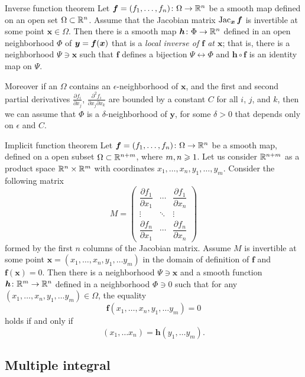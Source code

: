 \begin{thm}{Inverse function theorem}\label{thm:inverse}
Let $\bm{f}=(f_1,\dots,f_n)\colon\Omega\to\mathbb{R}^n$ be a smooth map
defined on an open set $\Omega\subset \mathbb{R}^n$.
Assume that the Jacobian matrix
$\mathop{\rm Jac}\nolimits_{\bm{x}}\bm{f}$
is invertible at some point $\bm{x}\in \Omega$.
Then there is a smooth map $\bm{h}\colon\Phi\to\mathbb{R}^n$ defined in an open neighborhood $\Phi$ of ${\bm{y}}\z=\bm{f}(\bm{x})$ that is a {}\emph{local inverse of $\bm{f}$ at $\bm{x}$};
that is, there is a neighborhood $\Psi\ni \bm{x}$ such that
$\bm{f}$ defines a bijection $\Psi\leftrightarrow \Phi$ and
$\bm{h} \circ \bm{f}$ is an identity map on $\Psi$.

Moreover if an $\Omega$ contains an $\epsilon$-neighborhood of $\bm{x}$, and the first and second partial derivatives $\tfrac{\partial f_i}{\partial x_j}$, $\tfrac{\partial^2 f_i}{\partial x_j\partial x_k}$ are bounded by a constant $C$ for all $i$, $j$, and $k$, then we can assume that $\Phi$ is a $\delta$-neighborhood of $\bm{y}$, for some $\delta>0$ that depends only on $\epsilon$ and $C$. 
\end{thm}

\begin{thm}{Implicit function theorem}\label{thm:imlicit}
Let $\bm{f}=(f_1,\dots,f_n)\colon\Omega\to\mathbb{R}^n$ be a smooth map, defined on a open subset $\Omega\subset\mathbb{R}^{n+m}$, where
$m,n\z\ge 1$.
Let us consider $\mathbb{R}^{n+m}$ as a product space $\mathbb{R}^n\times \mathbb{R}^m$ with coordinates 
$x_1,\dots,x_n,y_1,\dots,y_m$.
Consider the following matrix 
\[
M=\begin{pmatrix}
\dfrac{\partial f_1}{\partial x_1} & \cdots & \dfrac{\partial f_1}{\partial x_n}\\
\vdots & \ddots & \vdots\\
\dfrac{\partial f_n}{\partial x_1} & \cdots & \dfrac{\partial f_n}{\partial x_n} \end{pmatrix}\]
formed by the first $n$ columns of the Jacobian matrix.
Assume $M$ is invertible at some point $\bm{x}=(x_1,\dots,x_n,y_1,\dots y_m)$ in the domain of definition of $\bm{f}$ and $\bm{f}(\bm{x})=0$.
Then there is a neighborhood $\Psi\ni \bm{x}$
and a smooth function $\bm{h}\colon\mathbb{R}^m\to\mathbb{R}^n$ defined in a neighborhood $\Phi\ni 0$ such that
for any $(x_1,\dots,x_n,y_1,\dots y_m)\in \Omega$, the equality
\[\bm{f}(x_1,\dots,x_n,y_1,\dots y_m)=0\]
holds if and only if 
\[(x_1,\dots x_n)=\bm{h}(y_1,\dots y_m).\]

\end{thm}

\subsection*{Multiple integral}

